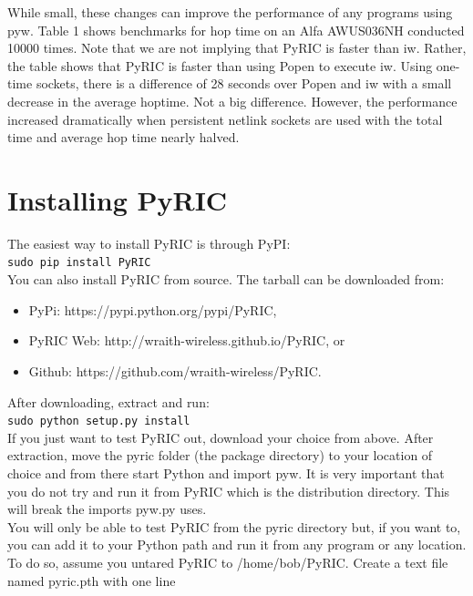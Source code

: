 \documentclass[11pt]{article}
\begin{document}
While small, these changes can improve the performance of any programs using pyw. 
Table 1 shows benchmarks for hop time on an Alfa AWUS036NH conducted 10000 times. 
Note that we are not implying that PyRIC is faster than iw. Rather, the table 
shows that PyRIC is faster than using Popen to execute iw. Using one-time sockets,
there is a difference of 28 seconds over Popen and iw with a small decrease in 
the average hoptime. Not a big difference. However, the performance increased
dramatically when persistent netlink sockets are used with the total time and 
average hop time nearly halved.

\section{Installing PyRIC}\label{sec:installing}
The easiest way to install PyRIC is through PyPI:\\

    \texttt{sudo pip install PyRIC}\\

You can also install PyRIC from source. The tarball can be downloaded from:

\begin{itemize}
\item PyPi: https://pypi.python.org/pypi/PyRIC,
\item PyRIC Web: http://wraith-wireless.github.io/PyRIC, or
\item Github: https://github.com/wraith-wireless/PyRIC.
\end{itemize}

After downloading, extract and run:\\

	\texttt{sudo python setup.py install}\\

If you just want to test PyRIC out, download your choice from above. After 
extraction, move the pyric folder (the package directory) to your location of 
choice and from there start Python and import pyw. It is very important that you
do not try and run it from PyRIC which is the distribution directory. This will 
break the imports pyw.py uses. \\

You will only be able to test PyRIC from the pyric directory but, if you want to,
you can add it to your Python path and run it from any program or any location.
To do so, assume you untared PyRIC to /home/bob/PyRIC. Create a text file named
pyric.pth with one line \\
\end{document}
